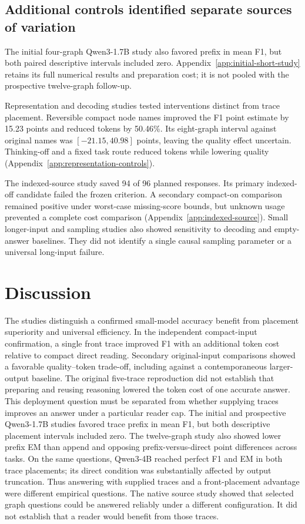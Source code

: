 \subsection{Additional controls identified separate sources of variation}
The initial four-graph Qwen3-1.7B study also favored prefix in mean F1, but both paired descriptive intervals included zero. Appendix~\ref{app:initial-short-study} retains its full numerical results and preparation cost; it is not pooled with the prospective twelve-graph follow-up.

Representation and decoding studies tested interventions distinct from trace placement. Reversible compact node names improved the F1 point estimate by 15.23 points and reduced tokens by 50.46\%. Its eight-graph interval against original names was $[-21.15,40.98]$ points, leaving the quality effect uncertain. Thinking-off and a fixed task route reduced tokens while lowering quality (Appendix~\ref{app:representation-controls}).

The indexed-source study saved 94 of 96 planned responses. Its primary indexed-off candidate failed the frozen criterion. A secondary compact-on comparison remained positive under worst-case missing-score bounds, but unknown usage prevented a complete cost comparison (Appendix~\ref{app:indexed-source}). Small longer-input and sampling studies also showed sensitivity to decoding and empty-answer baselines. They did not identify a single causal sampling parameter or a universal long-input failure.

\section{Discussion}
The studies distinguish a confirmed small-model accuracy benefit from placement superiority and universal efficiency. In the independent compact-input confirmation, a single front trace improved F1 with an additional token cost relative to compact direct reading. Secondary original-input comparisons showed a favorable quality--token trade-off, including against a contemporaneous larger-output baseline. The original five-trace reproduction did not establish that preparing and reusing reasoning lowered the token cost of one accurate answer. This deployment question must be separated from whether supplying traces improves an answer under a particular reader cap. The initial and prospective Qwen3-1.7B studies favored trace prefix in mean F1, but both descriptive placement intervals included zero. The twelve-graph study also showed lower prefix EM than append and opposing prefix-versus-direct point differences across tasks. On the same questions, Qwen3-4B reached perfect F1 and EM in both trace placements; its direct condition was substantially affected by output truncation. Thus answering with supplied traces and a front-placement advantage were different empirical questions. The native source study showed that selected graph questions could be answered reliably under a different configuration. It did not establish that a reader would benefit from those traces.


